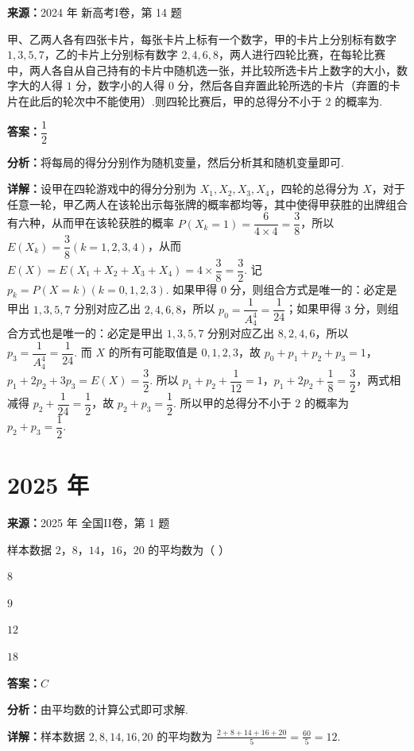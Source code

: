\begin{question}[points=5]
\textbf{来源：}2024 年 新高考I卷，第 14 题\par
甲、乙两人各有四张卡片，每张卡片上标有一个数字，甲的卡片上分别标有数字 $1,3,5,7$，乙的卡片上分别标有数字 $2,4,6,8$，两人进行四轮比赛，在每轮比赛中，两人各自从自己持有的卡片中随机选一张，并比较所选卡片上数字的大小，数字大的人得 $1$ 分，数字小的人得 $0$ 分，然后各自弃置此轮所选的卡片（弃置的卡片在此后的轮次中不能使用）.则四轮比赛后，甲的总得分不小于 $2$ 的概率为.
\fillin[{$\dfrac{1}{2}$}]
\begin{solution}
\textbf{答案：}$\dfrac{1}{2}$

\textbf{分析：}将每局的得分分别作为随机变量，然后分析其和随机变量即可.

\textbf{详解：}设甲在四轮游戏中的得分分别为 $X_1,X_2,X_3,X_4$，四轮的总得分为 $X$，对于任意一轮，甲乙两人在该轮出示每张牌的概率都均等，其中使得甲获胜的出牌组合有六种，从而甲在该轮获胜的概率 $P(X_k=1)=\dfrac{6}{4\times4}=\dfrac{3}{8}$，所以 $E(X_k)=\dfrac{3}{8}(k=1,2,3,4)$，从而 $E(X)=E(X_1+X_2+X_3+X_4)=4\times\dfrac{3}{8}=\dfrac{3}{2}$. 记 $p_k=P(X=k)(k=0,1,2,3)$. 如果甲得 $0$ 分，则组合方式是唯一的：必定是甲出 $1,3,5,7$ 分别对应乙出 $2,4,6,8$，所以 $p_0=\dfrac{1}{A_4^4}=\dfrac{1}{24}$；如果甲得 $3$ 分，则组合方式也是唯一的：必定是甲出 $1,3,5,7$ 分别对应乙出 $8,2,4,6$，所以 $p_3=\dfrac{1}{A_4^4}=\dfrac{1}{24}$. 而 $X$ 的所有可能取值是 $0,1,2,3$，故 $p_0+p_1+p_2+p_3=1$，$p_1+2p_2+3p_3=E(X)=\dfrac{3}{2}$. 所以 $p_1+p_2+\dfrac{1}{12}=1$，$p_1+2p_2+\dfrac{1}{8}=\dfrac{3}{2}$，两式相减得 $p_2+\dfrac{1}{24}=\dfrac{1}{2}$，故 $p_2+p_3=\dfrac{1}{2}$. 所以甲的总得分不小于 $2$ 的概率为 $p_2+p_3=\dfrac{1}{2}$.
\end{solution}
\end{question}

\section*{2025 年}

\begin{question}[points=5]
\textbf{来源：}2025 年 全国II卷，第 1 题\par
样本数据 $2$，$8$，$14$，$16$，$20$ 的平均数为（ ）
\begin{choices}
  \item $8$
  \item $9$
  \item $12$
  \item $18$
\end{choices}
\begin{solution}
\textbf{答案：}$C$

\textbf{分析：}由平均数的计算公式即可求解.

\textbf{详解：}样本数据 $2,8,14,16,20$ 的平均数为 $\frac{2+8+14+16+20}{5}=\frac{60}{5}=12$.
\end{solution}
\end{question}

